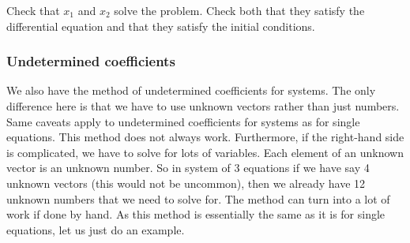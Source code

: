 \begin{exercise}
Check that $x_1$ and $x_2$ solve the problem.  Check both that they satisfy
the differential equation and that they satisfy the initial conditions.
\end{exercise}

\subsubsection{Undetermined coefficients}

We also have
the method of
undetermined coefficients for
systems.
The only
difference here is that we have to use unknown vectors rather than just
numbers.  Same caveats apply to undetermined coefficients for systems
as for single equations.  This method does not always work.
Furthermore, if the right-hand side is complicated, we have to solve
for lots of
variables.  Each element of an
unknown vector is an unknown number.  So in system of 3 equations if we have
say 4 unknown vectors (this would not be uncommon), then we already have 12
unknown numbers that we need to solve for.
The method can turn into a lot of
work if done by hand.
As this method is essentially the same as it is for single equations,
let us just do an example.

